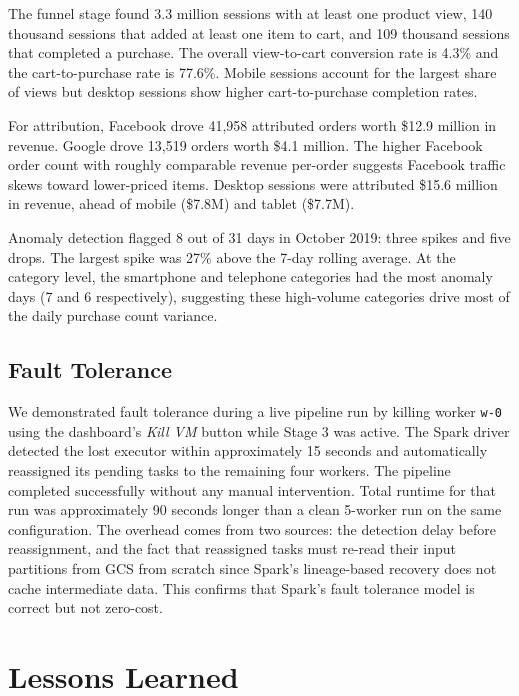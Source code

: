\documentclass[letterpaper,twocolumn,10pt]{article}
\begin{document}
The funnel stage found 3.3 million sessions with at least one product view, 140
thousand sessions that added at least one item to cart, and 109 thousand sessions
that completed a purchase. The overall view-to-cart conversion rate is 4.3\% and
the cart-to-purchase rate is 77.6\%. Mobile sessions account for the largest share
of views but desktop sessions show higher cart-to-purchase completion rates.

For attribution, Facebook drove 41,958 attributed orders worth \$12.9 million in
revenue. Google drove 13,519 orders worth \$4.1 million. The higher Facebook order
count with roughly comparable revenue per-order suggests Facebook traffic skews
toward lower-priced items. Desktop sessions were attributed \$15.6 million in
revenue, ahead of mobile (\$7.8M) and tablet (\$7.7M).

Anomaly detection flagged 8 out of 31 days in October 2019: three spikes and five
drops. The largest spike was 27\% above the 7-day rolling average. At the category
level, the smartphone and telephone categories had the most anomaly days (7 and 6
respectively), suggesting these high-volume categories drive most of the daily
purchase count variance.

\subsection{Fault Tolerance}

We demonstrated fault tolerance during a live pipeline run by killing worker
\texttt{w-0} using the dashboard's \textit{Kill VM} button while Stage 3 was
active. The Spark driver detected the lost executor within approximately 15 seconds
and automatically reassigned its pending tasks to the remaining four workers. The
pipeline completed successfully without any manual intervention. Total runtime for
that run was approximately 90 seconds longer than a clean 5-worker run on the same
configuration. The overhead comes from two sources: the detection delay before
reassignment, and the fact that reassigned tasks must re-read their input partitions
from GCS from scratch since Spark's lineage-based recovery does not cache
intermediate data. This confirms that Spark's fault tolerance model is correct but
not zero-cost.

\section{Lessons Learned}
\end{document}
